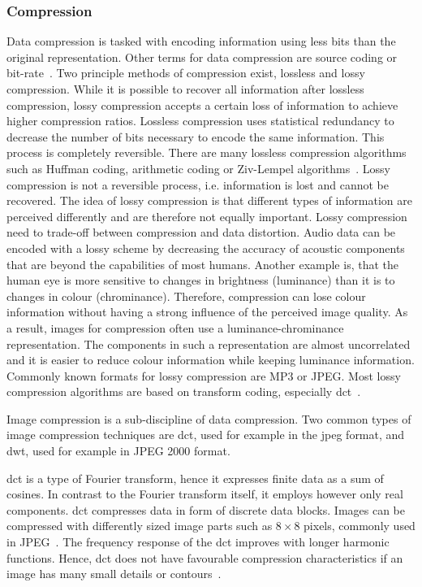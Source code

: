 \subsubsection{Compression} \label{sec:t_compress}
Data compression is tasked with encoding information using less bits than the original representation. Other terms for data compression are source coding or bit-rate~\cite{Mahdi2012ImplementingTechnique}. Two principle methods of compression exist, lossless and lossy compression. While it is possible to recover all information after lossless compression, lossy compression accepts a certain loss of information to achieve higher compression ratios.
Lossless compression uses statistical redundancy to decrease the number of bits necessary to encode the same information. This process is completely reversible. There are many lossless compression algorithms such as Huffman coding, arithmetic coding or Ziv-Lempel algorithms~\cite{Bocharova2009CompressionMultimedia}.
Lossy compression is not a reversible process, i.e. information is lost and cannot be recovered. The idea of lossy compression is that different types of information are perceived differently and are therefore not equally important. Lossy compression need to trade-off between compression and data distortion. Audio data can be encoded with a lossy scheme by decreasing the accuracy of acoustic components that are beyond the capabilities of most humans. Another example is, that the human eye is more sensitive to changes in brightness (luminance) than it is to changes in colour (chrominance). Therefore, compression can lose colour information without having a strong influence of the perceived image quality. As a result, images for compression often use a luminance-chrominance representation. The components in such a representation are almost uncorrelated and it is easier to reduce colour information while keeping luminance information. Commonly known formats for lossy compression are MP3 or JPEG. Most lossy compression algorithms are based on transform coding, especially \gls{dct}~\cite{Bocharova2009CompressionMultimedia}.

Image compression is a sub-discipline of data compression. Two common types of image compression techniques are \gls{dct}, used for example in the \gls{jpeg} format, and \gls{dwt}, used for example in JPEG 2000 format.

\Gls{dct} is a type of Fourier transform, hence it expresses finite data as a sum of cosines. In contrast to the Fourier transform itself, it employs however only real components. \Gls{dct} compresses data in form of discrete data blocks. Images can be compressed with differently sized image parts such as $8\times8$ pixels, commonly used in JPEG~\cite{Bocharova2009CompressionMultimedia}.
The frequency response of the \gls{dct} improves with longer harmonic functions. Hence, \gls{dct} does not have favourable compression characteristics if an image has many small details or contours~\cite{Bocharova2009CompressionMultimedia}.

